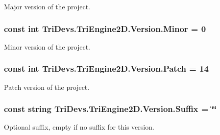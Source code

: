 Major version of the project. 

\hypertarget{class_tri_devs_1_1_tri_engine2_d_1_1_version_a46c99b37d8caad10a9702e9823f6cded}{
\subsubsection[{Minor}]{\setlength{\rightskip}{0pt plus 5cm}const int Tri\-Devs.\-Tri\-Engine2\-D.\-Version.\-Minor = 0}}\label{class_tri_devs_1_1_tri_engine2_d_1_1_version_a46c99b37d8caad10a9702e9823f6cded}


Minor version of the project. 

\hypertarget{class_tri_devs_1_1_tri_engine2_d_1_1_version_a5baa982b0404ea5ed3d2526e26f55809}{
\subsubsection[{Patch}]{\setlength{\rightskip}{0pt plus 5cm}const int Tri\-Devs.\-Tri\-Engine2\-D.\-Version.\-Patch = 14}}\label{class_tri_devs_1_1_tri_engine2_d_1_1_version_a5baa982b0404ea5ed3d2526e26f55809}


Patch version of the project. 

\hypertarget{class_tri_devs_1_1_tri_engine2_d_1_1_version_a5f7a61ae54163decac64e6acbe25e76d}{
\subsubsection[{Suffix}]{\setlength{\rightskip}{0pt plus 5cm}const string Tri\-Devs.\-Tri\-Engine2\-D.\-Version.\-Suffix = \char`\"{}\char`\"{}}}\label{class_tri_devs_1_1_tri_engine2_d_1_1_version_a5f7a61ae54163decac64e6acbe25e76d}


Optional suffix, empty if no suffix for this version. 

